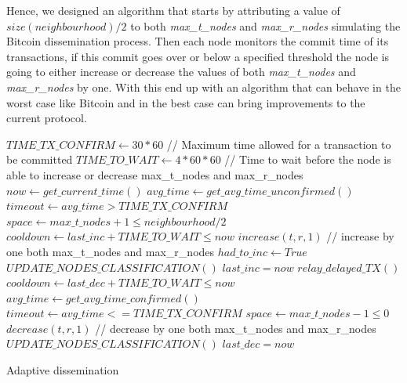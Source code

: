 Hence, we designed an algorithm that starts by attributing a value of $size(neighbourhood) / 2$ to both \textsl{max\_t\_nodes} and \textsl{max\_r\_nodes} simulating the Bitcoin dissemination process. Then each node monitors the commit time of its transactions, if this commit goes over or below a specified threshold the node is going to either increase or decrease the values of both \textsl{max\_t\_nodes} and \textsl{max\_r\_nodes} by one. With this end up with an algorithm that can behave in the worst case like Bitcoin and in the best case can bring improvements to the current protocol.

\begin{algorithm}
\begin{algorithmic}[1]
\Variables
 \State $TIME\_TX\_CONFIRM \gets 30*60$ // Maximum time allowed for a transaction to be committed
 \State $TIME\_TO\_WAIT \gets 4*60*60$ // Time to wait before the node is able to increase or decrease max\_t\_nodes and max\_r\_nodes
\EndVariables
{}
\State $now \gets get\_current\_time()$
\State $avg\_time \gets get\_avg\_time\_unconfirmed()$
\State $timeout \gets avg\_time > TIME\_TX\_CONFIRM$
\State $space \gets max\_t\_nodes + 1 \leq neighbourhood / 2$
\State $cooldown \gets last\_inc + TIME\_TO\_WAIT \leq now$
  \State $increase(t, r, 1)$ // increase by one both max\_t\_nodes and max\_r\_nodes
  \State $had\_to\_inc \gets True$
  \State $UPDATE\_NODES\_CLASSIFICATION()$
  \State $last\_inc = now$
  \State $relay\_delayed\_TX()$
\EndIf
\State $cooldown \gets last\_dec + TIME\_TO\_WAIT \leq now$
  \State $avg\_time \gets get\_avg\_time\_confirmed()$
  \State $timeout \gets avg\_time <= TIME\_TX\_CONFIRM$
  \State $space \gets max\_t\_nodes - 1 \leq 0$
    \State $decrease(t, r, 1)$ // decrease by one both max\_t\_nodes and max\_r\_nodes
    \State $UPDATE\_NODES\_CLASSIFICATION()$
    \State $last\_dec = now$
  \EndIf
\EndIf
\EndFunction
\end{algorithmic}
\caption{Adaptive dissemination}
\label{alg:inc}
\end{algorithm}


